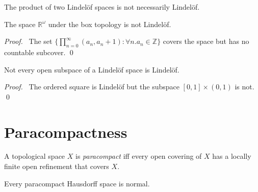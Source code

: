 \begin{cor}
The product of two Lindel\"{o}f spaces is not necessarily Lindel\"{o}f.
\end{cor}

\begin{prop}
The space $\mathbb{R}^\omega$ under the box topology is not Lindel\"{o}f.
\end{prop}

\begin{proof}
\pf\ The set $\{ \prod_{n=0}^\infty (a_n, a_n + 1) : \forall n. a_n \in \mathbb{Z} \}$ covers the space but has no countable subcover. \qed
\end{proof}

\begin{prop}
Not every open subspace of a Lindel\"{o}f space is Lindel\"{o}f.
\end{prop}

\begin{proof}
\pf\ The ordered square is Lindel\"{o}f but the subspace $[0,1]
\times (0,1)$ is not. \qed
\end{proof}

\section{Paracompactness}

\begin{df}[Paracompact]
A topological space $X$ is \emph{paracompact} iff every open covering of $X$ has a locally finite open refinement that covers $X$.
\end{df}

\begin{thm}
\label{thm:topology:paracompact:Hausdorff_normal}
Every paracompact Hausdorff space is normal.
\end{thm}

